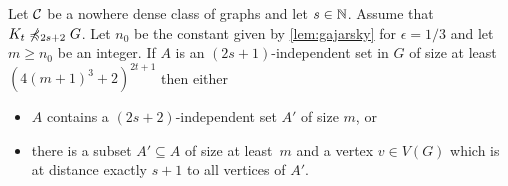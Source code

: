 \begin{lemma}\label{lem:apex}
Let $\mathcal{C}$ be a nowhere dense class of graphs and let $s\in \mathbb{N}$. 
Assume that $K_t\not\preccurlyeq_{2s+2} G$. 
Let $n_0$ be the constant given by \cref{lem:gajarsky} for $\epsilon=1/3$ 
and let $m\geq n_0$ be an integer. 
If $A$ is an $(2s+1)$-independent set in $G$ of size at least $(4(m+1)^3+2)^{2t+1}$ 
then either 
\begin{itemize}
\item $A$ contains a $(2s+2)$-independent set $A'$ of size $m$, or
\item there is a subset $A'\subseteq A$ of size at least~$m$ and
a vertex $v\in V(G)$ which is at distance exactly $s+1$ to all vertices of $A'$. 
\end{itemize}
\end{lemma}




     



